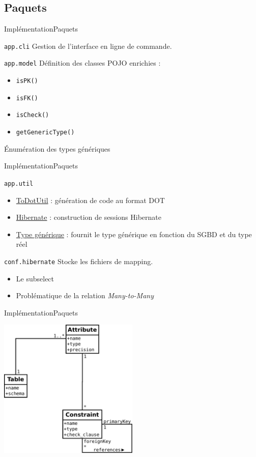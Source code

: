 \subsection{Paquets}
\begin{frame}{Implémentation}{Paquets}
	\begin{block}{\texttt{app.cli}}
	Gestion de l'interface en ligne de commande.
	\end{block}
	\begin{block}{\texttt{app.model}}
	Définition des classes POJO enrichies :
	\begin{itemize}
	\item \texttt{isPK()}
	\item \texttt{isFK()}
	\item \texttt{isCheck()}
	\item \texttt{getGenericType()}
	\end{itemize}
	Énumération des types génériques
	\end{block}
\end{frame}

\begin{frame}{Implémentation}{Paquets}
	\begin{block}{\texttt{app.util}}
	\begin{itemize}
		\item \underline{ToDotUtil} : génération de code au format DOT
		\item \underline{Hibernate} : construction de sessions Hibernate
		\item \underline{Type générique} : fournit le type générique en fonction du SGBD et du type réel
	\end{itemize}
	\end{block}
	
	\begin{block}{\texttt{conf.hibernate}}
	Stocke les fichiers de mapping.
	\begin{itemize}
		\item Le subselect
		\item Problématique de la relation \textit{Many-to-Many}
	\end{itemize}
	\end{block}
\end{frame}

\begin{frame}{Implémentation}{Paquets}
\begin{center}
\includegraphics[width=0.5\textwidth]{files/diag_class_final}
\end{center}
\end{frame}

